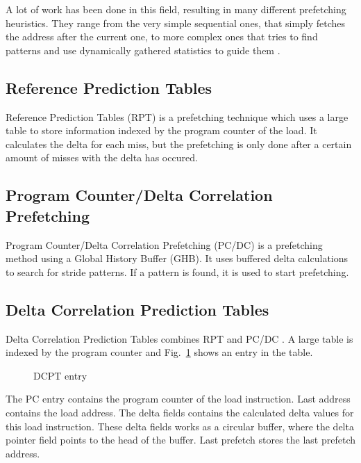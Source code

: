 A lot of work has been done in this field, resulting in many different prefetching heuristics. They
range from the very simple sequential ones, that simply fetches the address after the current one,
to more complex ones that tries to find patterns and use dynamically gathered statistics to guide
them \cite{prefetch_range}.

\subsection{Reference Prediction Tables}
Reference Prediction Tables (RPT) is a prefetching technique which uses a large table to store information indexed by the program counter of the load. It calculates the delta for each miss, but the prefetching is only done after a certain amount of misses with the delta has occured.

\subsection{Program Counter/Delta Correlation Prefetching}
Program Counter/Delta Correlation Prefetching (PC/DC) is a prefetching method using a Global History Buffer (GHB). It uses buffered delta calculations to search for stride patterns. If a pattern is found, it is used to start prefetching.

\subsection{Delta Correlation Prediction Tables} 
Delta Correlation Prediction Tables combines RPT and PC/DC \cite{dcpt}. A large table is indexed by
the program counter and Fig.~\ref{fig:dcpt_entry} shows an entry in the table.
\begin{figure}[h]
	\begin{center}
	\end{center}
	\caption{DCPT entry\label{fig:dcpt_entry}}
\end{figure}
The PC entry contains the program counter of the load instruction. Last address contains the load
address. The delta fields contains the calculated delta values for this load instruction. These
delta fields works as a circular buffer, where the delta pointer field points to the head of the
buffer. Last prefetch stores the last prefetch address.






